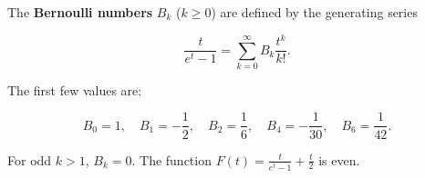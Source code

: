 The \textbf{Bernoulli numbers} $B_k$ ($k \geq 0$) are defined by the generating series

$$\frac{t}{e^t - 1} = \sum_{k=0}^{\infty} B_k \frac{t^k}{k!}.$$

The first few values are:

$$B_0 = 1, \quad B_1 = -\frac{1}{2}, \quad B_2 = \frac{1}{6}, \quad B_4 = -\frac{1}{30}, \quad B_6 = \frac{1}{42}.$$

For odd $k > 1$, $B_k = 0$. The function $F(t) = \frac{t}{e^t - 1} + \frac{t}{2}$ is even.
